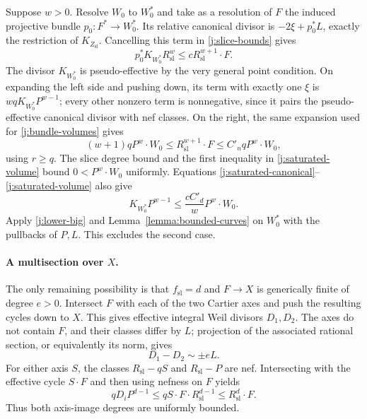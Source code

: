 \documentclass[12pt,a4paper,psamsfonts]{amsart}
\theoremstyle{definition}
\theoremstyle{plain}
\begin{document}
Suppose $w>0$. Resolve $W_0$ to $W_0^*$ and take as a resolution
of $F$ the induced projective bundle
$p_0:F^*\to W_0^*$. Its relative canonical divisor is
$-2\xi+p_0^*L$, exactly the restriction of
$K_{Z_{\mathrm{sl}}}$. Cancelling this term in
\eqref{j:slice-bounds} gives
\begin{equation}\label{j:saturated-canonical}
 p_0^*K_{W_0^*}R_{\mathrm{sl}}^w
                   \le cR_{\mathrm{sl}}^{w+1}\cdot F.
\end{equation}
The divisor $K_{W_0^*}$ is pseudo-effective by the very general
point condition. On expanding the left side and pushing down, its
term with exactly one $\xi$ is
$wqK_{W_0^*}P^{w-1}$; every other nonzero term is nonnegative,
since it pairs the pseudo-effective canonical divisor with nef
classes. On the right, the same expansion used for
\eqref{j:bundle-volumes} gives
\begin{equation}\label{j:saturated-volume}
 (w+1)qP^w\cdot W_0
 \le R_{\mathrm{sl}}^{w+1}\cdot F
 \le C'_nqP^w\cdot W_0,
\end{equation}
using $r\ge q$. The slice degree bound and the first inequality in
\eqref{j:saturated-volume} bound $0<P^w\cdot W_0$ uniformly.
Equations \eqref{j:saturated-canonical}--\eqref{j:saturated-volume}
also give
\[
 K_{W_0^*}P^{w-1}\le\frac{cC'_d}{w}P^w\cdot W_0.
\]
Apply \eqref{j:lower-big} and Lemma~\ref{lemma:bounded-curves}
on $W_0^*$ with the pullbacks of $P,L$. This excludes the second
case.

\paragraph{A multisection over $X$.}
The only remaining possibility is that $f_{\mathrm{sl}}=d$ and
$F\to X$ is generically finite of degree $e>0$. Intersect $F$ with
each of the two Cartier axes and push the resulting cycles down
to $X$. This gives effective integral Weil divisors $D_1,D_2$.
The axes do not contain $F$, and their classes differ by $L$;
projection of the associated rational section, or equivalently its
norm, gives
\begin{equation}\label{j:signed-L}
                         D_1-D_2\sim\pm eL.
\end{equation}
For either axis $S$, the classes $R_{\mathrm{sl}}-qS$ and
$R_{\mathrm{sl}}-P$ are nef. Intersecting with the effective cycle
$S\cdot F$ and then using nefness on $F$ yields
\begin{equation}\label{j:axis-degrees}
 qD_iP^{d-1}\le qS\cdot F\cdot R_{\mathrm{sl}}^{d-1}
                  \le R_{\mathrm{sl}}^d\cdot F.
\end{equation}
Thus both axis-image degrees are uniformly bounded.
\end{document}
